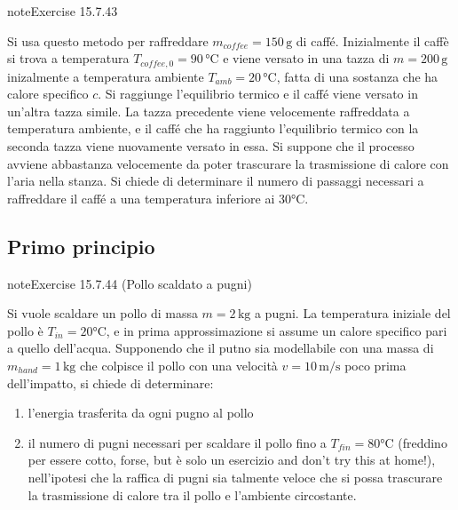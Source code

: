 \documentclass[letterpaper,10pt,italian]{jupyterBook}
\begin{document}
\begin{sphinxadmonition}{note}{Exercise 15.7.43}



\sphinxAtStartPar
Si usa questo metodo per raffreddare \(m_{coffee} = 150 \, \text{g}\) di caffé. Inizialmente il caffè si trova a temperatura \(T_{coffee,0} = 90 \, \text{°C}\) e viene versato in una tazza di \(m = 200 \, \text{g}\) inizalmente a temperatura ambiente \(T_{amb} = 20 \, \text{°C}\), fatta di una sostanza che ha calore specifico \(c\). Si raggiunge l’equilibrio termico e il caffé viene versato in un’altra tazza simile. La tazza precedente viene velocemente raffreddata a temperatura ambiente, e il caffé che ha raggiunto l’equilibrio termico con la seconda tazza viene nuovamente versato in essa. Si suppone che il processo avviene abbastanza velocemente da poter trascurare la trasmissione di calore con l’aria nella stanza. Si chiede di determinare il numero di passaggi necessari a raffreddare il caffé a una temperatura inferiore ai \(30 \text{°C}\).
\end{sphinxadmonition}


\subsection{Primo principio}
\label{\detokenize{ch/thermodynamics/principles-problems:primo-principio}} \label{exercise:ch/thermodynamics/principles-problems-exercise-43}

\begin{sphinxadmonition}{note}{Exercise 15.7.44 (Pollo scaldato a pugni)}



\sphinxAtStartPar
Si vuole scaldare un pollo di massa \(m = 2 \, \text{kg}\) a pugni. La temperatura iniziale del pollo è \(T_{in} = 20 \text{°C}\), e in prima approssimazione si assume un calore specifico pari a quello dell’acqua. Supponendo che il putno sia modellabile con una massa di \(m_{hand} = 1 \, \text{kg}\) che colpisce il pollo con una velocità \(v = 10 \, \text{m/s}\) poco prima dell’impatto, si chiede di determinare:
\begin{enumerate}
%
\item {} 
\sphinxAtStartPar
l’energia trasferita da ogni pugno al pollo

\item {} 
\sphinxAtStartPar
il numero di pugni necessari per scaldare il pollo fino a \(T_{fin} = 80 \text{°C}\) (freddino per essere cotto, forse, but è solo un esercizio and don’t try this at home!), nell’ipotesi che la raffica di pugni sia talmente veloce che si possa trascurare la trasmissione di calore tra il pollo e l’ambiente circostante.

\end{enumerate}
\end{sphinxadmonition}
 \label{exercise:ch/thermodynamics/principles-problems-exercise-44}
\end{document}
